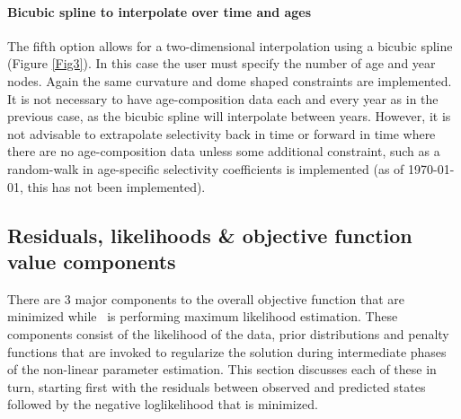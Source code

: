 \paragraph{Bicubic spline to interpolate over time and ages}  The fifth option allows for a two-dimensional interpolation using a bicubic spline (Figure \ref{Fig3}).  In this case the user must specify the number of age and year nodes.  Again the same curvature and dome shaped constraints are implemented.  It is not necessary to have age-composition data each and every year as in the previous case, as the bicubic spline will interpolate between years.  However, it is not advisable to extrapolate selectivity back in time or forward in time where there are no age-composition data unless some additional constraint, such as a random-walk in age-specific selectivity coefficients is implemented (as of \today, this has not been implemented).

	

\subsection{Residuals, likelihoods \& objective function value components}

There are 3 major components to the overall objective function that are minimized while \iscam\ is performing maximum likelihood estimation.  These components consist of the likelihood of the data, prior distributions and penalty functions that are invoked to regularize the solution during intermediate phases of the non-linear parameter estimation.  This section discusses each of these in turn, starting first with the residuals between observed and predicted states followed by the negative loglikelihood that is minimized.

